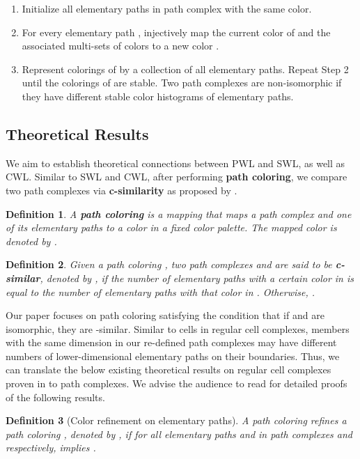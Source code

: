 \documentclass[letterpaper]{article} \usepackage{aaai24}  \usepackage{times}  \usepackage{helvet}  \usepackage{courier}  \usepackage[hyphens]{url}  \usepackage{graphicx} \urlstyle{rm} \def\UrlFont{\rm}  \usepackage{natbib}  \usepackage{caption} \frenchspacing  \setlength{\pdfpagewidth}{8.5in} \setlength{\pdfpageheight}{11in} \usepackage{algorithm}
\newtheorem{definition}{Definition}
\begin{document}
\begin{enumerate}
    \item Initialize all elementary paths in path complex  with the same color.
    \item For every elementary path , injectively map the current color of  and the associated multi-sets of colors to a new color .
    \item Represent colorings of  by a collection of all elementary paths. Repeat Step 2 until the colorings of  are stable. Two path complexes are non-isomorphic if they have different stable color histograms of elementary paths.
\end{enumerate}

\subsection{Theoretical Results} \label{subsec:theoretical-results}
We aim to establish theoretical connections between PWL and SWL, as well as CWL. Similar to SWL and CWL, after performing \textbf{path coloring}, we compare two path complexes via \textbf{c-similarity} as proposed by \citeauthor{bodnar_weisfeiler_2021}.

\begin{definition}
    A \textbf{path coloring} is a mapping  that maps a path complex  and one of its elementary paths  to a color in a fixed color palette. The mapped color is denoted by .
\end{definition}

\begin{definition}
    Given a path coloring , two path complexes  and  are said to be \textbf{c-similar}, denoted by , if the number of elementary paths with a certain color in  is equal to the number of elementary paths with that color in . Otherwise, .
\end{definition}

Our paper focuses on path coloring  satisfying the condition that if  and  are isomorphic, they are -similar. Similar to cells in regular cell complexes, members with the same dimension in our re-defined path complexes may have different numbers of lower-dimensional elementary paths on their boundaries. Thus, we can translate the below existing theoretical results on regular cell complexes proven in \cite{bodnar_weisfeiler_2022} to path complexes. We advise the audience to read \cite{bodnar_weisfeiler_2021, bodnar_weisfeiler_2022} for detailed proofs of the following results.

\begin{definition}[Color refinement on elementary paths]\label{def:color_refinement}
    A path coloring  refines a path coloring , denoted by , if  for all elementary paths  and  in path complexes  and  respectively,  implies .
\end{definition}
\end{document}
